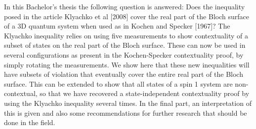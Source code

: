 In this Bachelor’s thesis the following question is answered: Does the
inequality posed in the article Klyachko et al [2008] cover the real
part of the Bloch surface of a 3D quantum system when used as in Kochen
and Specker [1967]? The Klyachko inequality relies on using five
measurements to show contextuality of a subset of states on the real
part of the Bloch surface. These can now be used in several
configurations as present in the Kochen-Specker contextuality proof, by
simply rotating the measurements. We show here that these new
inequalities will have subsets of violation that eventually cover the
entire real part of the Bloch surface. This can be extended to show that
all states of a spin 1 system are non-contextual, so that we have
recovered a state-independent contextuality proof by using the Klyachko
inequality several times. In the final part, an interpretation of this is
given and also some recommendations for further research that should be
done in the field.
